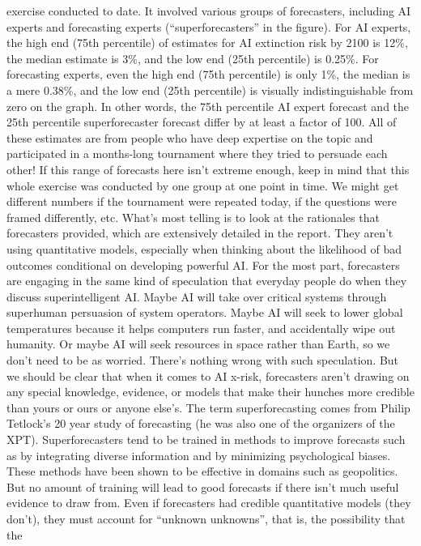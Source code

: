 exercise conducted to date. It involved various groups of forecasters,
including AI experts and forecasting experts (“superforecasters” in
the ﬁgure). For AI experts, the high end (75th percentile) of estimates
for AI extinction risk by 2100 is 12\%, the median estimate is 3\%, and
the low end (25th percentile) is 0.25\%. For forecasting experts, even
the high end (75th percentile) is only 1\%, the median is a mere
0.38\%, and the low end (25th percentile) is visually indistinguishable
from zero on the graph. In other words, the 75th percentile AI expert
forecast and the 25th percentile superforecaster forecast differ by at
least a factor of 100.
All of these estimates are from people who have deep expertise on
the topic and participated in a months-long tournament where they
tried to persuade each other! If this range of forecasts here isn’t
extreme enough, keep in mind that this whole exercise was
conducted by one group at one point in time. We might get different
numbers if the tournament were repeated today, if the questions
were framed differently, etc.
What’s most telling is to look at the rationales that forecasters
provided, which are extensively detailed in the report. They aren’t
using quantitative models, especially when thinking about the
likelihood of bad outcomes conditional on developing powerful AI.
For the most part, forecasters are engaging in the same kind of
speculation that everyday people do when they discuss
superintelligent AI. Maybe AI will take over critical systems through
superhuman persuasion of system operators. Maybe AI will seek to
lower global temperatures because it helps computers run faster, and
accidentally wipe out humanity. Or maybe AI will seek resources in
space rather than Earth, so we don’t need to be as worried. There’s
nothing wrong with such speculation. But we should be clear that
when it comes to AI x-risk, forecasters aren’t drawing on any special
knowledge, evidence, or models that make their hunches more
credible than yours or ours or anyone else’s.
The term superforecasting comes from Philip Tetlock’s 20 year study
of forecasting (he was also one of the organizers of the XPT).
Superforecasters tend to be trained in methods to improve forecasts
such as by integrating diverse information and by minimizing
psychological biases. These methods have been shown to be
effective in domains such as geopolitics. But no amount of training
will lead to good forecasts if there isn’t much useful evidence to draw
from.
Even if forecasters had credible quantitative models (they don’t), they
must account for “unknown unknowns”, that is, the possibility that the
